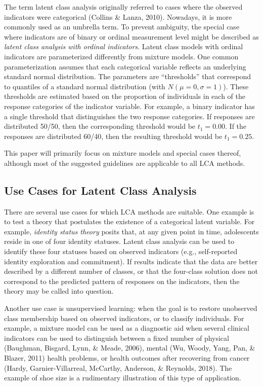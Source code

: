 \documentclass[
  ,man,floatsintext]{apa6}
\begin{document}
The term latent class analysis originally referred to cases where the
observed indicators were categorical (Collins \& Lanza, 2010).
Nowadays, it is more commonly used
as an umbrella term. To prevent ambiguity, the special case where
indicators are of binary or ordinal measurement level might be described
as \emph{latent class analysis with ordinal indicators}. Latent class models
with ordinal indicators are parameterized differently from mixture
models. One common parameterization assumes that each categorical
variable reflects an underlying standard normal distribution. The
parameters are ``thresholds'' that correspond to quantiles of a standard
normal distribution (with \(N(\mu = 0, \sigma = 1)\)). These thresholds
are estimated based on the proportion of individuals in each of the
response categories of the indicator variable. For example, a binary
indicator has a single threshold that distinguishes the two response
categories. If responses are distributed 50/50, then the corresponding
threshold would be \(t_1 = 0.00\). If the responses are distributed 60/40,
then the resulting threshold would be \(t_1 = 0.25\).

This paper will primarily focus on mixture models and special cases
thereof, although most of the suggested guidelines are applicable to all
LCA methods.

\hypertarget{use-cases-for-latent-class-analysis}{%
\subsection{Use Cases for Latent Class Analysis}\label{use-cases-for-latent-class-analysis}}

There are several use cases for which LCA methods are suitable. One
example is to test a theory that postulates the existence of a
categorical latent variable. For example, \emph{identity status theory}
posits that, at any given point in time, adolescents reside in one of
four identity statuses. Latent class analysis can be used to identify
these four statuses based on observed indicators (e.g., self-reported
identity exploration and commitment). If results indicate that the data
are better described by a different number of classes, or that the
four-class solution does not correspond to the predicted pattern of
responses on the indicators, then the theory may be called into
question.

Another use case is unsupervised learning: when the goal is to restore
unobserved class membership based on observed indicators, or to classify
individuals. For example, a mixture model can be used as a diagnostic
aid when several clinical indicators can be used to distinguish between
a fixed number of physical (Baughman, Bisgard, Lynn, \& Meade, 2006), mental
(Wu, Woody, Yang, Pan, \& Blazer, 2011) health problems, or health outcomes after recovering from cancer (Hardy, Garnier-Villarreal, McCarthy, Anderson, \& Reynolds, 2018). The example of shoe size is a
rudimentary illustration of this type of application.
\end{document}
